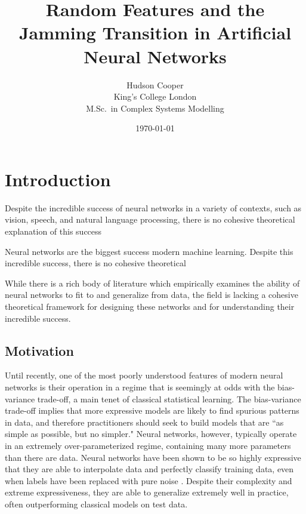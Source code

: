 \documentclass[a4paper, 12pt]{article}
\begin{document}
\title{\bf Random Features and the Jamming Transition in Artificial Neural Networks}
\author{
    Hudson Cooper\\ %
    King's College London\\
    M.Sc.\ in Complex Systems Modelling
}
\date{\today}

\begin{titlingpage}
\maketitle
\begin{abstract}
\lipsum[1]
\end{abstract}
\end{titlingpage}

\section{Introduction}

Despite the incredible success of neural networks in a variety of contexts, such as vision, speech, and natural language processing, there is no cohesive theoretical explanation of this success 


Neural networks are the biggest success modern machine learning. Despite this incredible success, there is no cohesive theoretical 


While there is a rich body of literature which empirically examines the ability of neural networks to fit to and generalize from data, the field is lacking a cohesive theoretical framework for designing these networks and for understanding their incredible success. \\

\subsection{Motivation}

Until recently, one of the most poorly understood features of modern neural networks is their operation in a regime that is seemingly at odds with the bias-variance trade-off, a main tenet of classical statistical learning. The bias-variance trade-off implies that more expressive models are likely to find spurious patterns in data, and therefore practitioners should seek to build models that are ``as simple as possible, but no simpler." Neural networks, however, typically operate in an extremely over-parameterized regime, containing many more parameters than there are data. Neural networks have been shown to be so highly expressive that they are able to interpolate data and perfectly classify training data, even when labels have been replaced with pure noise \cite{zhangUnderstandingDeepLearning2017}. Despite their complexity and extreme expressiveness, they are able to generalize extremely well in practice, often outperforming classical models on test data. \\
\end{document}
